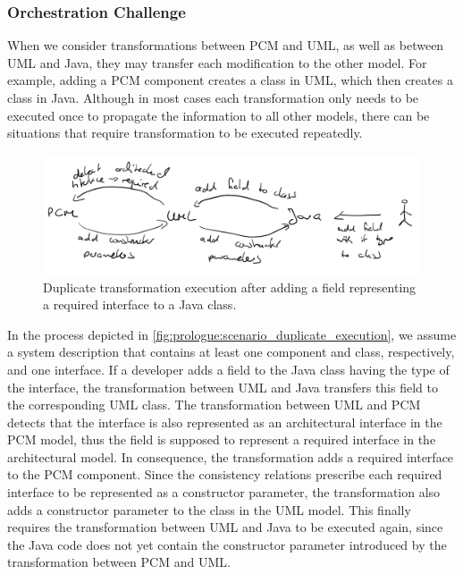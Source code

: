 \subsubsection*{Orchestration Challenge}

When we consider transformations between \gls{PCM} and \gls{UML}, as well as between \gls{UML} and Java, they may transfer each modification to the other model.
For example, adding a \gls{PCM} component creates a class in \gls{UML}, which then creates a class in Java.
Although in most cases each transformation only needs to be executed once to propagate the information to all other models, there can be situations that require transformation to be executed repeatedly.

\begin{figure}
    \centering
    \includegraphics[width=\textwidth]{figures/prologue/scenario_duplicate_execution.png}
    \caption[Example for transformation orchestration]{Duplicate transformation execution after adding a field representing a required interface to a Java class.}
    \label{fig:prologue:scenario_duplicate_execution}
\end{figure}

In the process depicted in \autoref{fig:prologue:scenario_duplicate_execution}, we assume a system description that contains at least one component and class, respectively, and one interface.
If a developer adds a field to the Java class having the type of the interface, the transformation between \gls{UML} and Java transfers this field to the corresponding \gls{UML} class.
The transformation between \gls{UML} and \gls{PCM} detects that the interface is also represented as an architectural interface in the \gls{PCM} model, thus the field is supposed to represent a required interface in the architectural model.
In consequence, the transformation adds a required interface to the \gls{PCM} component.
Since the consistency relations prescribe each required interface to be represented as a constructor parameter, the transformation also adds a constructor parameter to the class in the \gls{UML} model.
This finally requires the transformation between \gls{UML} and Java to be executed again, since the Java code does not yet contain the constructor parameter introduced by the transformation between \gls{PCM} and \gls{UML}.

